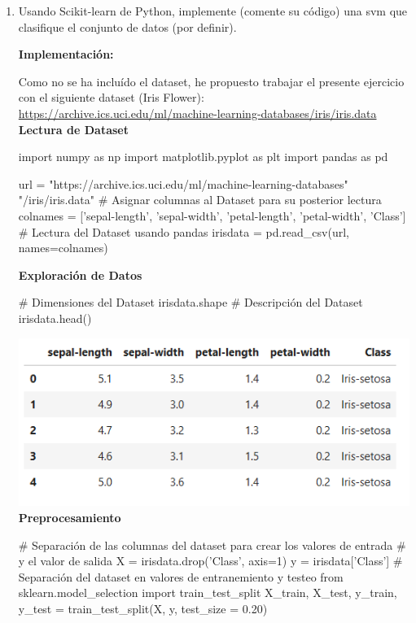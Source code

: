 \documentclass[paper=a4, fontsize=11pt]{scrartcl}
\numberwithin{equation}{section}		%
\numberwithin{figure}{section}			%
\numberwithin{table}{section}				%
\begin{document}
\begin{enumerate}
    \item Usando Scikit-learn de Python, implemente (comente su código) una svm que clasifique el conjunto de datos (por definir).
    
    \textbf{Implementación:}
    
    Como no se ha incluído el dataset, he propuesto trabajar el presente ejercicio con el siguiente dataset (Iris Flower):\\
    \url{https://archive.ics.uci.edu/ml/machine-learning-databases/iris/iris.data}\\
    
    \textbf{Lectura de Dataset}
    
    \begin{python}
    import numpy as np  
    import matplotlib.pyplot as plt  
    import pandas as pd
    
    url = "https://archive.ics.uci.edu/ml/machine-learning-databases"
          "/iris/iris.data"
    # Asignar columnas al Dataset para su posterior lectura
    colnames = ['sepal-length', 'sepal-width', 
                'petal-length', 'petal-width', 'Class']
    # Lectura del Dataset usando pandas
    irisdata = pd.read_csv(url, names=colnames)
    \end{python}
    
    \textbf{Exploración de Datos}
    
    \begin{python}
    # Dimensiones del Dataset
    irisdata.shape
    # Descripción del Dataset
    irisdata.head()
    \end{python}
    
    \includegraphics[scale=0.8]{df1_head}
    \newpage
    \textbf{Preprocesamiento}
    
    \begin{python}
    # Separación de las columnas del dataset para crear los valores de entrada
    # y el valor de salida
    X = irisdata.drop('Class', axis=1)  
    y = irisdata['Class'] 
    # Separación del dataset en valores de entranemiento y testeo
    from sklearn.model_selection import train_test_split  
    X_train, X_test, y_train, y_test = train_test_split(X, y, test_size = 0.20)
    \end{python}
    

\end{enumerate}
\end{document}
